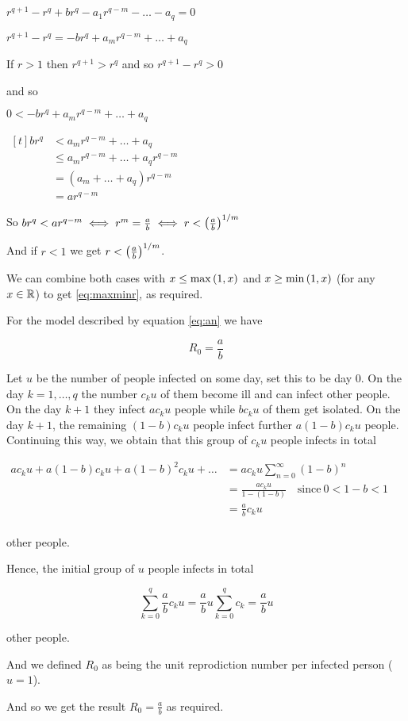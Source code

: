 \begin{theorem}
\begin{pf}
\begin{enumerate}[(a)]
    \imp $r^{q+1} - r^q + br^q - a_1r^{q-m} - \dots -  a_q=0$
    
    \imp $r^{q+1} - r^q =-br^q + a_mr^{q-m} + \dots  + a_q$
    
    If $r>1$ then $r^{q+1}>r^q$ and so $r^{q+1}-r^q>0$
    
    and so 
    
    $0<-br^q + a_mr^{q-m} +  \dots + a_q$
    
    \imp $\begin{aligned}[t]
    br^q 
    &<    a_mr^{q-m} +  \dots + a_q\\
    &\leq a_mr^{q-m} +  \dots + a_qr^{q-m} \\
    &= (a_m + \dots + a_q)r^{q-m} \\
    &= ar^{q-m} 
    \end{aligned}$
    
    So $br^q < ar^{q-m} \iff r^m=\frac{a}{b} \iff r<\left(\frac{a}{b}\right)^{1/m}$
    
    And if $r<1$ we get $r<\left(\frac{a}{b}\right)^{1/m}$.
    
    We can combine both cases with $x\leq \max\left(1,x\right)$ and $x\geq \min\left(1,x\right)$ (for any $x\in \mathbb R$) to get \ref{eq:maxminr}, as required.
\end{enumerate}
\end{pf}
\end{theorem}

\begin{lemma}
For the model described by equation \ref{eq:an} we have

$$R_0=\frac{a}{b}$$

\begin{pf}
Let $u$ be the number of people infected on some day, set this to be day $0$. On the day $k = 1, \dots , q$ the number $c_ku$ of them become ill and can infect other people. On the day $k + 1$ they infect $ac_ku$ people while $bc_ku$ of them get isolated. On the day $k + 1$, the remaining $(1 - b) c_ku$ people infect further $a (1 - b) c_ku$ people. Continuing this way, we obtain that this group of $c_ku$ people infects in total

$\begin{aligned}
ac_ku+a(1-b)c_ku+a(1-b)^2c_ku+\dots 
&= ac_ku\sum\limits_{n=0}^\infty (1-b)^n \\
&= \frac{ac_ku}{1-(1-b)} \quad \text{since} \ 0<1-b<1\\
&=\frac{a}{b}c_ku\\
\end{aligned}$ 

other people.

Hence, the initial group of $u$ people infects in total 

$$\sum\limits_{k=0}^q \frac{a}{b}c_ku 
= \frac{a}{b}u\sum\limits_{k=0}^q c_k
= \frac{a}{b}u$$

other people.

And we defined $R_0$ as being the unit reprodiction number per infected person ($u=1$).

And so we get the result $R_0=\frac{a}{b}$ as required.
\end{pf}
\end{lemma}


